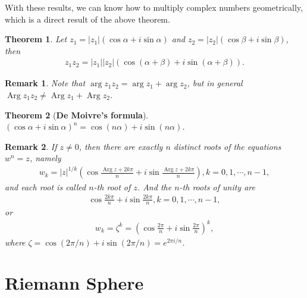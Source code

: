 \documentclass[11pt]{book}
\newtheorem{theorem}{Theorem}[chapter]
\newtheorem{remark}{Remark}[chapter]
\theoremstyle{definition}
\numberwithin{equation}{chapter}
\begin{document}
\medskip

With these results, we can know how to multiply complex numbers geometrically, which is a direct result of the above theorem.

\medskip

\begin{theorem}
Let $z_1 = \left|z_1\right| \left(\cos \alpha + i \sin \alpha\right)$ and $z_2 = \left|z_2\right| \left(\cos \beta + i \sin \beta\right)$, then 
\begin{align*}
    z_1 z_2 = \left|z_1\right| \left|z_2\right| \left(\cos (\alpha + \beta) + i \sin (\alpha + \beta)\right).
\end{align*}
\end{theorem}

\begin{remark}
Note that $\arg z_1 z_2 = \arg z_1 + \arg z_2$, but in general $\operatorname{Arg} z_1 z_2 \neq \operatorname{Arg} z_1 + \operatorname{Arg} z_2$.
\end{remark}

\medskip

\begin{theorem}[{\bf De Moivre's formula}]
$\left(\cos \alpha + i \sin \alpha\right)^n = \cos (n\alpha) + i \sin (n\alpha)$.
\end{theorem}

\begin{remark}
If $z \neq 0$, then there are exactly $n$ distinct roots of the equations $w^n = z$, namely
\begin{align*}
    w_k = \left|z\right|^{1/k} \left(\cos \frac{\operatorname{Arg} z + 2k\pi}{n} + i \sin \frac{\operatorname{Arg} z + 2k\pi}{n} \right), k = 0,1,\cdots,n-1,
\end{align*}
and each root is called $n$-th root of $z$. And the $n$-th roots of unity are 
\begin{align*}
    \cos \frac{2k\pi}{n} + i \sin \frac{2k\pi}{n}, k = 0,1,\cdots,n-1,
\end{align*}
or 
\begin{align*}
    w_k = \zeta^k = \left(\cos \frac{2\pi}{n} + i \sin \frac{2\pi}{n}\right)^k, 
\end{align*}
where $\zeta = \cos (2\pi/n) + i \sin (2\pi/n) = e^{2\pi i/n}$.
\end{remark}

\medskip

\section{Riemann Sphere}
\end{document}
